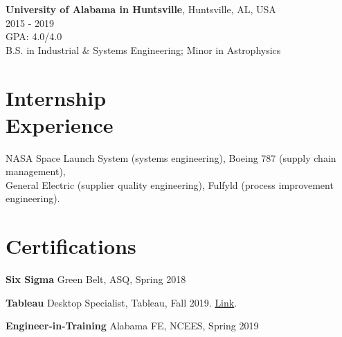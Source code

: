 \documentclass[margin,line]{res}
\begin{document}
\begin{resume}
\vspace{-.35cm}
{\bf University of Alabama in Huntsville}, Huntsville, AL, USA\\
2015 - 2019\\
GPA: 4.0/4.0\\
B.S. in Industrial \& Systems Engineering; Minor in Astrophysics\\


\vspace{-.35cm}
\section{\sc Internship \\ Experience}
NASA Space Launch System (systems engineering), Boeing 787 (supply chain management), \\ General Electric (supplier quality engineering), Fulfyld (process improvement engineering). 



\vspace{.25cm}



\vspace{.15cm}

\section{\sc Certifications}
{\bf Six Sigma} Green Belt, ASQ, Spring 2018
\vspace*{-3mm}

{\bf Tableau} Desktop Specialist, Tableau, Fall 2019. \href{https://www.credly.com/badges/e9a605a8-1977-4a1c-ab24-149a37c7fb36/linked_in_profile}{Link}.
\vspace*{-3mm}

{\bf Engineer-in-Training} Alabama FE, NCEES, Spring 2019
\vspace*{-3mm}


\end{resume}
\end{document}
